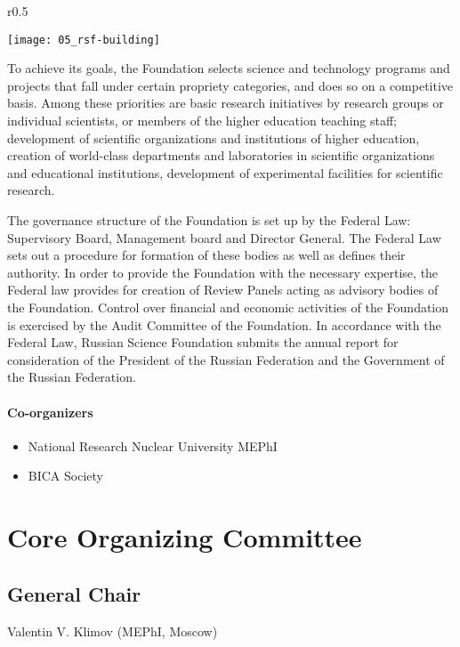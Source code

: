 \documentclass[10pt,fleqn,openany]{book} %
\begin{document}
\begin{wrapfigure}{r}{0.5\textwidth}
	\begin{center}
		\texttt{[image: 05\_rsf-building]}
	\end{center}
\end{wrapfigure}

To achieve its goals, the Foundation selects science and technology programs and projects that fall under certain propriety categories, and does so on a competitive basis. Among these priorities are basic research initiatives by research groups or individual scientists, or members of the higher education teaching staff; development of scientific organizations and institutions of higher education, creation of world-class departments and laboratories in scientific organizations and educational institutions, development of experimental facilities for scientific research.

The governance structure of the Foundation is set up by the Federal Law: Supervisory Board, Management board and Director General. The Federal Law sets out a  procedure for formation of these bodies as well as defines their authority. In order to provide the Foundation with the necessary expertise, the Federal law provides for creation of Review Panels acting as advisory bodies of the Foundation. Control over financial and economic activities of the Foundation is exercised by the Audit Committee of the Foundation. In accordance with the Federal Law, Russian Science Foundation submits the annual report for consideration of the President of the Russian Federation and the Government of the Russian Federation.

\vfill

\paragraph{Co-organizers}
	\begin{itemize}
		\item National Research Nuclear University MEPhI
		\item BICA Society
	\end{itemize}

\section{Core Organizing Committee}

\subsection{General Chair}
	Valentin V. Klimov (MEPhI, Moscow)
\end{document}
